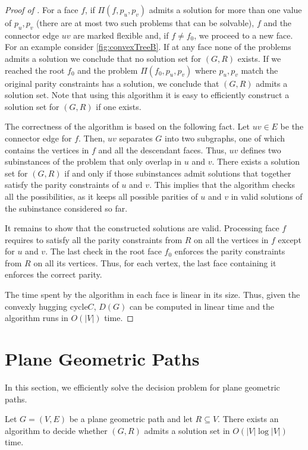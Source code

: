 \documentclass[a4paper,runningheads,cleveref,thm-restate]{lipics-v2021}
\newcommand{\hset}{solution set\xspace}
\newcommand{\invertible}{flexible\xspace}%
\newcommand{\hug}{hugging cycle\xspace}
\begin{document}
\begin{proof}[Proof of ]
	For a face $f$, if $\Pi(f,p_u,p_v)$ admits a solution for more than one value of $p_u,p_v$ (there are at most two such problems that can be solvable), 
	$f$ and the connector edge $uv$ are marked \invertible and, if $f \ne f_0$, we proceed to a new face. For an example consider \cref{fig:convexTreeB}.
	If at any face none of the problems admits a solution we conclude that no \hset for $(G,R)$ exists. 
	If we reached the root $f_0$ and the problem $\Pi(f_0,p_u,p_v)$ where $p_u,p_v$ match the original parity constraints has a solution, we conclude that $(G,R)$ admits a \hset. 
	Note that using this algorithm it is easy to efficiently construct a \hset for $(G,R)$ if one exists.   
	

	The correctness of the algorithm is based on the following fact. 
	Let $uv \in E$ be the connector edge for $f$.
	Then, $uv$ separates $G$ into two subgraphs, one of which contains 
	the vertices 
	in $f$ and 
	all the descendant faces. %
	Thus, $uv$ defines two subinstances of the problem that only overlap in $u$ and $v$.  
	There exists a \hset for $(G,R)$ if and only if those subinstances admit solutions that together satisfy the parity constraints of $u$ and $v$. 
	This implies that the algorithm checks all the possibilities, as it keeps all possible parities of $u$ and $v$ in valid solutions of the subinstance considered so far.
	
	It remains to show that the constructed solutions are valid. 
	Processing face $f$ requires to satisfy all the parity constraints from $R$ on all the vertices in $f$ except for $u$ and $v$. 
	The last check in the root face $f_0$ enforces the parity constraints from $R$ on all its vertices.
	Thus, for each vertex, the last face containing it enforces the correct parity.
	
	The time spent by the algorithm in each face is linear in its size. 
	Thus, given the convexly \hug $C$, $D(G)$ can be computed in linear time and the algorithm runs in $O(|V|)$ time.
\end{proof}



\section{Plane Geometric Paths}
\label{sec:paths}
In this section, we efficiently solve the decision problem for plane geometric paths. 


\begin{theorem}
	\label{thm:paths}
	Let $G=(V,E)$ be a plane geometric path and let $R\subseteq V$. There exists an algorithm to decide whether $(G,R)$ admits a \hset in $O(|V|\log |V|)$ time.
\end{theorem}
\end{document}
